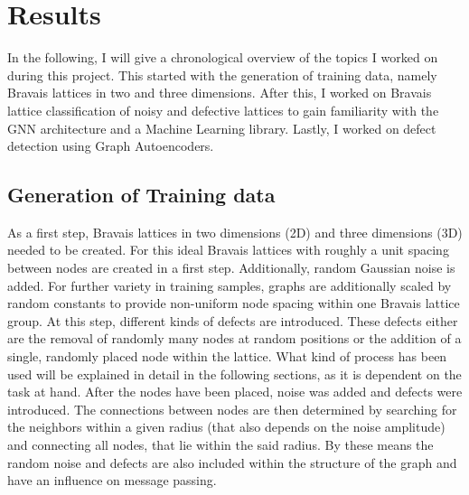 \documentclass[11pt,a4paper]{article}
\begin{document}
\section{Results}
\label{sec:Results}
In the following, I will give a chronological overview of the topics I worked on during this project. 
This started with the generation of training data, namely Bravais lattices in two and three dimensions. After this, I worked on Bravais lattice classification of noisy and defective lattices to gain familiarity with the GNN architecture and a Machine Learning library. Lastly, I worked on defect detection using Graph Autoencoders. 

\subsection{Generation of Training data}
\label{ssec:Generation of training data}
As a first step, Bravais lattices in two dimensions (2D) and three dimensions (3D) needed to be created. 
For this ideal Bravais lattices with roughly a unit spacing between nodes are created in a first step. 
Additionally, random Gaussian noise is added. 
For further variety in training samples, graphs are additionally scaled by random constants to provide non-uniform node spacing within one Bravais lattice group. 
At this step, different kinds of defects are introduced. 
These defects either are the removal of randomly many nodes at random positions or the addition of a single, randomly placed node within the lattice. 
What kind of process has been used will be explained in detail in the following sections, as it is dependent on the task at hand. 
After the nodes have been placed, noise was added and defects were introduced. 
The connections between nodes are then determined by searching for the neighbors within a given radius (that also depends on the noise amplitude) and connecting all nodes, that lie within the said radius. 
By these means the random noise and defects are also included within the structure of the graph and have an influence on message passing. \\
\end{document}
